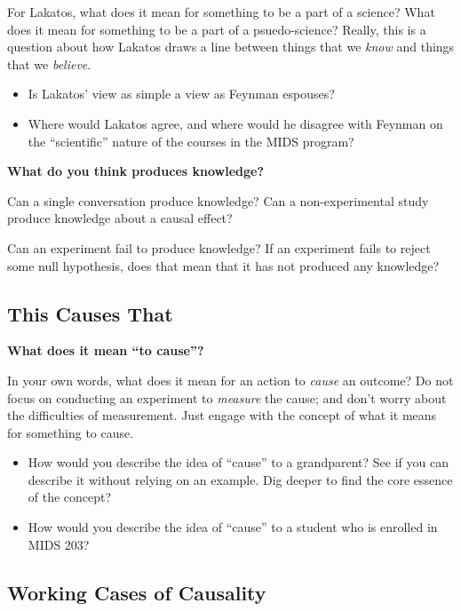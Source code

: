 \documentclass[
]{article}
\providecommand{\tightlist}{%
  \setlength{\itemsep}{0pt}\setlength{\parskip}{0pt}}
\begin{document}
For Lakatos, what does it mean for something to be a part of a science? What does it mean for something to be a part of a psuedo-science? Really, this is a question about how Lakatos draws a line between things that we \emph{know} and things that we \emph{believe}.

\begin{itemize}
\tightlist
\item
  Is Lakatos' view as simple a view as Feynman espouses?
\item
  Where would Lakatos agree, and where would he disagree with Feynman on the ``scientific'' nature of the courses in the MIDS program?
\end{itemize}

\textbf{What do you think produces knowledge?}

Can a single conversation produce knowledge? Can a non-experimental study produce knowledge about a causal effect?

Can an experiment fail to produce knowledge? If an experiment fails to reject some null hypothesis, does that mean that it has not produced any knowledge?

\hypertarget{this-causes-that}{%
\subsection{This Causes That}\label{this-causes-that}}

\textbf{What does it mean ``to cause''?}

In your own words, what does it mean for an action to \emph{cause} an outcome? Do not focus on conducting an experiment to \emph{measure} the cause; and don't worry about the difficulties of measurement. Just engage with the concept of what it means for something to cause.

\begin{itemize}
\tightlist
\item
  How would you describe the idea of ``cause'' to a grandparent? See if you can describe it without relying on an example. Dig deeper to find the core essence of the concept?
\item
  How would you describe the idea of ``cause'' to a student who is enrolled in MIDS 203?
\end{itemize}

\hypertarget{working-cases-of-causality}{%
\subsection{Working Cases of Causality}\label{working-cases-of-causality}}
\end{document}
